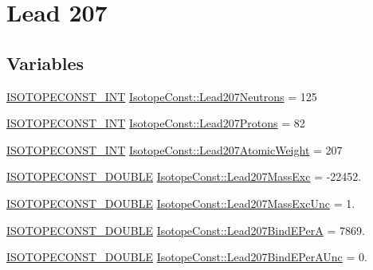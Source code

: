 \hypertarget{group___isotope_const-_lead-_pb207}{}\section{Lead 207}
\label{group___isotope_const-_lead-_pb207}
\subsection*{Variables}
\begin{DoxyCompactItemize}
\item 
\mbox{\hyperlink{group___isotope_const-_macros_ga5f18360b3e99483a35c32d789e62621c}{I\+S\+O\+T\+O\+P\+E\+C\+O\+N\+S\+T\+\_\+\+I\+NT}} \mbox{\hyperlink{group___isotope_const-_lead-_pb207_ga8f4d5a27a8f63c462d477b65f9970e6c}{Isotope\+Const\+::\+Lead207\+Neutrons}} = 125
\item 
\mbox{\hyperlink{group___isotope_const-_macros_ga5f18360b3e99483a35c32d789e62621c}{I\+S\+O\+T\+O\+P\+E\+C\+O\+N\+S\+T\+\_\+\+I\+NT}} \mbox{\hyperlink{group___isotope_const-_lead-_pb207_ga6632a095e87181bbc092572f9b38ac13}{Isotope\+Const\+::\+Lead207\+Protons}} = 82
\item 
\mbox{\hyperlink{group___isotope_const-_macros_ga5f18360b3e99483a35c32d789e62621c}{I\+S\+O\+T\+O\+P\+E\+C\+O\+N\+S\+T\+\_\+\+I\+NT}} \mbox{\hyperlink{group___isotope_const-_lead-_pb207_gaf5004bd180b814df789467477bb3e560}{Isotope\+Const\+::\+Lead207\+Atomic\+Weight}} = 207
\item 
\mbox{\hyperlink{group___isotope_const-_macros_ga8f45a7272ce02c0b4c65c44636ed719a}{I\+S\+O\+T\+O\+P\+E\+C\+O\+N\+S\+T\+\_\+\+D\+O\+U\+B\+LE}} \mbox{\hyperlink{group___isotope_const-_lead-_pb207_ga26d699f0c79eed0f554f0b861125cd88}{Isotope\+Const\+::\+Lead207\+Mass\+Exc}} = -\/22452.
\item 
\mbox{\hyperlink{group___isotope_const-_macros_ga8f45a7272ce02c0b4c65c44636ed719a}{I\+S\+O\+T\+O\+P\+E\+C\+O\+N\+S\+T\+\_\+\+D\+O\+U\+B\+LE}} \mbox{\hyperlink{group___isotope_const-_lead-_pb207_gae2a7c341ca581b9cef1d32eec5c5620d}{Isotope\+Const\+::\+Lead207\+Mass\+Exc\+Unc}} = 1.
\item 
\mbox{\hyperlink{group___isotope_const-_macros_ga8f45a7272ce02c0b4c65c44636ed719a}{I\+S\+O\+T\+O\+P\+E\+C\+O\+N\+S\+T\+\_\+\+D\+O\+U\+B\+LE}} \mbox{\hyperlink{group___isotope_const-_lead-_pb207_ga368a8120e126723cbcd1dd09bf1abbd7}{Isotope\+Const\+::\+Lead207\+Bind\+E\+PerA}} = 7869.
\item 
\mbox{\hyperlink{group___isotope_const-_macros_ga8f45a7272ce02c0b4c65c44636ed719a}{I\+S\+O\+T\+O\+P\+E\+C\+O\+N\+S\+T\+\_\+\+D\+O\+U\+B\+LE}} \mbox{\hyperlink{group___isotope_const-_lead-_pb207_ga229fb038786537d815d4e1d94e62d035}{Isotope\+Const\+::\+Lead207\+Bind\+E\+Per\+A\+Unc}} = 0.

\end{DoxyCompactItemize}
